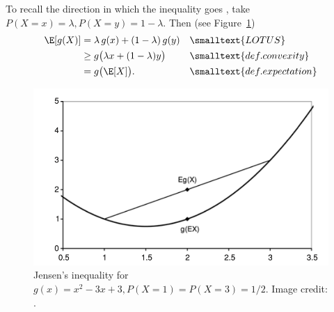 \documentclass{article} %
\begin{document}
\begin{remark}
To recall the direction in which the inequality goes \cite[pp.28]{durrett2010probability}, take $P(X=x) = \lambda, P(X=y) = 1-\lambda$.  Then (see Figure~\ref{fig:jensens_inequality_per_durrett}) 
\begin{align*}
	\E[g(X)] &= \lambda \, g(x) + (1-\lambda) \, g(y) && \smalltext{LOTUS} \\
	& \geq g \big(\lambda x  + (1-\lambda) y  \big) && \smalltext{def. convexity}\\
		&= g \big( \E[X] \big). && \smalltext{def. expectation} 
\end{align*}
%

\begin{figure}[H] 
\centering
\includegraphics[width=.5\textwidth]{images/jensens_inequality_per_durrett}
\caption{Jensen's inequality for $g(x) = x^2 - 3x + 3, P(X=1) = P(X=3) = 1/2$. Image credit: \cite[pp.28]{durrett2010probability}.}
\label{fig:jensens_inequality_per_durrett}
\end{figure}

\end{remark}
\end{document}
